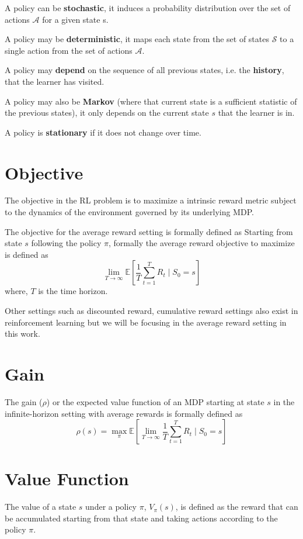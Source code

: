 A policy can be \textbf{stochastic}, it induces a probability distribution over the set of actions $\mathcal{A}$ for a given state s.

A policy may be \textbf{deterministic}, it maps each state from the set of states $\mathcal{S}$ to a single action from the set of actions $\mathcal{A}$.

A policy may \textbf{depend} on the sequence of all previous states, i.e. the \textbf{history}, that the learner has visited. 

A policy may also be \textbf{Markov} (where that current state is a sufficient statistic of the previous states), it only depends on the current state $s$ that the learner is in.

A policy is \textbf{stationary} if it does not change over time.

\section{Objective}

The objective in the RL problem is to maximize a intrinsic reward metric subject to the dynamics of the environment governed by its underlying MDP.

The objective for the average reward setting is formally defined as
Starting from state $s$ following the policy $\pi$, formally the average reward objective to maximize is defined as
$$\lim_{T \to \infty} \mathbb{E}\left[\frac{1}{T} \sum_{t=1}^{T} R_t \mid S_0 = s\right]$$
where, $T$ is the time horizon.

Other settings such as discounted reward, cumulative reward settings also exist in reinforcement learning but we will be focusing in the average reward setting in this work.

\section{Gain}

The gain ($\rho$) or the expected value function of an MDP starting at state $s$ in the infinite-horizon setting with average rewards is formally defined as
$$\rho(s) = \max_\pi \mathbb{E}\left[\lim_{T \to \infty} \frac{1}{T} \sum_{t=1}^{T} R_t \mid S_0 = s\right]$$

\section{Value Function}

The value of a state $s$ under a policy $\pi$, $V_\pi(s)$, is defined as the reward that can be accumulated starting from that state and taking actions according to the policy $\pi$. 

